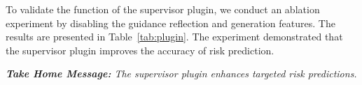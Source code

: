 To validate the function of the supervisor plugin, we conduct an ablation experiment by disabling the guidance reflection and generation features. The results are presented in Table~\ref{tab:plugin}. The experiment demonstrated that the supervisor plugin improves the accuracy of risk prediction. 

\textit{\textbf{Take Home Message: } The supervisor plugin enhances targeted risk predictions.}







